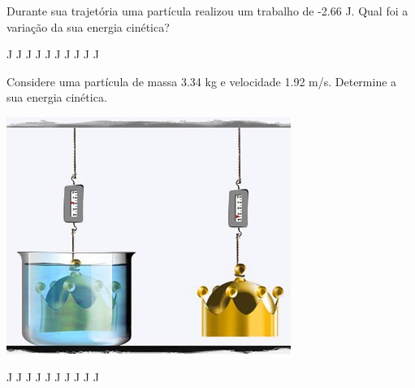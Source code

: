 \documentclass[12pt, addpoints]{exam}
\begin{document}
\begin{questions}
\begin{multicols}{2}
\question[33] Durante sua trajetória uma partícula realizou um trabalho de   -2.66 J. Qual foi a variação da sua energia cinética?

\begin{oneparchoices}
 J J J J J J J J J J\end{oneparchoices}

\begin{oneparchoices}
\end{oneparchoices}
\question[23] Considere uma partícula de massa    3.34 kg e velocidade    1.92 m/s. Determine a sua energia cinética.

\begin{center}
\begin{minipage}[c]{0.75\linewidth}
\includegraphics[width=\textwidth]{MWE001.jpg}
\end{minipage}

\end{center}
\begin{oneparchoices}
 J J J J J J J J J J\end{oneparchoices}

\begin{oneparchoices}
\end{oneparchoices}
\end{multicols}
\end{questions}
\end{document}
